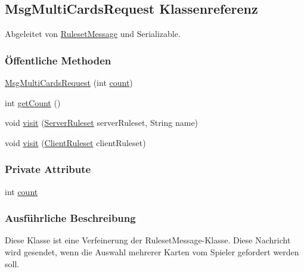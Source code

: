 \hypertarget{a00047}{\subsection{Msg\-Multi\-Cards\-Request Klassenreferenz}
\label{a00047}
}


Abgeleitet von \hyperlink{a00053}{Ruleset\-Message} und Serializable.

\subsubsection*{Öffentliche Methoden}
\begin{DoxyCompactItemize}
\item 
\hyperlink{a00047_a8bddd71e746b26a73e6f873006972fcb}{Msg\-Multi\-Cards\-Request} (int \hyperlink{a00047_ad43c3812e6d13e0518d9f8b8f463ffcf}{count})
\item 
int \hyperlink{a00047_ae452b1c7e00c383f2916c4a530fab737}{get\-Count} ()
\item 
void \hyperlink{a00047_ab45288da8f64e79408f1effd5579b5c2}{visit} (\hyperlink{a00068}{Server\-Ruleset} server\-Ruleset, String name)
\item 
void \hyperlink{a00047_acb5be722a2d1c9110d39f31c6e18f6e7}{visit} (\hyperlink{a00056}{Client\-Ruleset} client\-Ruleset)
\end{DoxyCompactItemize}
\subsubsection*{Private Attribute}
\begin{DoxyCompactItemize}
\item 
\hypertarget{a00047_ad43c3812e6d13e0518d9f8b8f463ffcf}{int \hyperlink{a00047_ad43c3812e6d13e0518d9f8b8f463ffcf}{count}}\label{a00047_ad43c3812e6d13e0518d9f8b8f463ffcf}

\end{DoxyCompactItemize}


\subsubsection{Ausführliche Beschreibung}
Diese Klasse ist eine Verfeinerung der Ruleset\-Message-\/\-Klasse. Diese Nachricht wird gesendet, wenn die Auswahl mehrerer Karten vom Spieler gefordert werden soll. 

